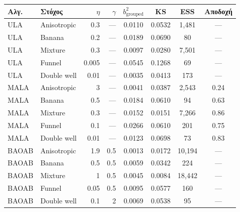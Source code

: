 \begin{tabular}{llrrcccc}
\toprule
Αλγ. & Στόχος & $\eta$ & $\gamma$ & $b^2_{\mathrm{grouped}}$ & KS & ESS & Αποδοχή \\
\midrule
ULA & Anisotropic & 0.3 & --- & 0.0110 & 0.0532 & 1,481 & --- \\
ULA & Banana & 0.2 & --- & 0.0189 & 0.0690 & 80 & --- \\
ULA & Mixture & 0.3 & --- & 0.0097 & 0.0280 & 7,501 & --- \\
ULA & Funnel & 0.005 & --- & 0.0545 & 0.1268 & 69 & --- \\
ULA & Double well & 0.01 & --- & 0.0035 & 0.0413 & 173 & --- \\
\midrule
MALA & Anisotropic & 3 & --- & 0.0041 & 0.0387 & 2,543 & 0.24 \\
MALA & Banana & 0.5 & --- & 0.0184 & 0.0610 & 94 & 0.63 \\
MALA & Mixture & 0.3 & --- & 0.0152 & 0.0151 & 7,266 & 0.86 \\
MALA & Funnel & 0.1 & --- & 0.0266 & 0.0610 & 201 & 0.75 \\
MALA & Double well & 0.01 & --- & 0.0123 & 0.0698 & 73 & 0.83 \\
\midrule
BAOAB & Anisotropic & 1.9 & 0.5 & 0.0013 & 0.0172 & 10,194 & --- \\
BAOAB & Banana & 0.5 & 0.5 & 0.0059 & 0.0342 & 224 & --- \\
BAOAB & Mixture & 1 & 0.5 & 0.0045 & 0.0084 & 18,442 & --- \\
BAOAB & Funnel & 0.05 & 0.5 & 0.0095 & 0.0577 & 160 & --- \\
BAOAB & Double well & 0.1 & 2 & 0.0069 & 0.0538 & 95 & --- \\
\bottomrule
\end{tabular}
